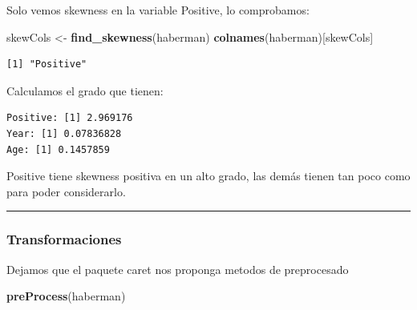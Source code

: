 \documentclass[
]{article}
\newenvironment{Shaded}{\begin{snugshade}}{\end{snugshade}}
\newcommand{\KeywordTok}[1]{\textcolor[rgb]{0.13,0.29,0.53}{\textbf{#1}}}
\newcommand{\NormalTok}[1]{#1}
\newcommand{\OperatorTok}[1]{\textcolor[rgb]{0.81,0.36,0.00}{\textbf{#1}}}
\newcommand{\StringTok}[1]{\textcolor[rgb]{0.31,0.60,0.02}{#1}}
\begin{document}
Solo vemos skewness en la variable Positive, lo comprobamos:

\begin{Shaded}
\begin{Highlighting}[]
\NormalTok{skewCols <-}\StringTok{ }\KeywordTok{find_skewness}\NormalTok{(haberman)}
\KeywordTok{colnames}\NormalTok{(haberman)[skewCols]}
\end{Highlighting}
\end{Shaded}

\begin{verbatim}
[1] "Positive"
\end{verbatim}

Calculamos el grado que tienen:

\begin{Shaded}
\end{Shaded}

\begin{verbatim}
Positive: [1] 2.969176
Year: [1] 0.07836828
Age: [1] 0.1457859
\end{verbatim}

Positive tiene skewness positiva en un alto grado, las demás tienen tan
poco como para poder considerarlo.

\begin{center}\rule{0.5\linewidth}{0.5pt}\end{center}

\hypertarget{transformaciones}{%
\subsubsection{Transformaciones}\label{transformaciones}}

Dejamos que el paquete caret nos proponga metodos de preprocesado

\begin{Shaded}
\begin{Highlighting}[]
\KeywordTok{preProcess}\NormalTok{(haberman)}
\end{Highlighting}
\end{Shaded}
\end{document}
